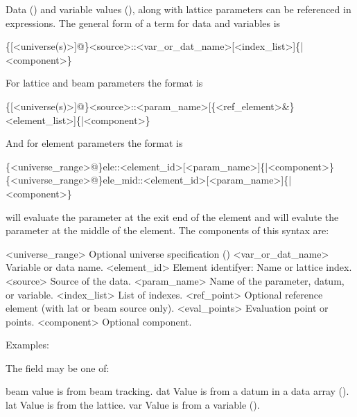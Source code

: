 Data () and variable values
(), along with lattice parameters can be
referenced in expressions. The general form of a term for
data and variables is
\begin{example}
  \{[<universe(s)>]@\}<source>::<var_or_dat_name>[<index_list>]\{|<component>\}
\end{example}
For lattice and beam parameters the format is
\begin{example}
  \{[<universe(s)>]@\}<source>::<param_name>[\{<ref_element>&\}<element_list>]\{|<component>\}
\end{example}
And for element parameters the format is
\begin{example}
  \{<universe_range>@\}ele::<element_id>[<param_name>]\{|<component>\}
  \{<universe_range>@\}ele_mid::<element_id>[<param_name>]\{|<component>\}
\end{example}
 will evaluate the parameter at the exit end of the element and 
 will evalute the parameter at the middle of the element.
The components of this syntax are:
\begin{example}
  <universe_range>    Optional universe specification ()
  <var_or_dat_name>   Variable or data name.
  <element_id>        Element identifyer: Name or lattice index.
  <source>            Source of the data.
  <param_name>        Name of the parameter, datum, or variable.
  <index_list>        List of indexes.
  <ref_point>         Optional reference element (with lat or beam source only).
  <eval_points>       Evaluation point or points.
  <component>         Optional component. 
\end{example}
Examples:

The  field may be one of:
\begin{example}
  beam        value is from beam tracking.
  dat         Value is from a \tao datum in a data array ().
  lat         Value is from the lattice.
  var         Value is from a \tao variable ().
\end{example}

